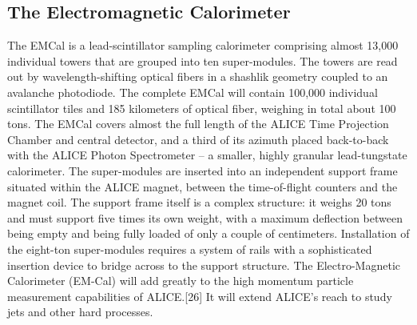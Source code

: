 \subsection{The Electromagnetic Calorimeter}
The EMCal is a lead-scintillator sampling calorimeter comprising almost 13,000 individual towers that are grouped into ten super-modules. The towers are read out by wavelength-shifting optical fibers in a shashlik geometry coupled to an avalanche photodiode. The complete EMCal will contain 100,000 individual scintillator tiles and 185 kilometers of optical fiber, weighing in total about 100 tons.
The EMCal covers almost the full length of the ALICE Time Projection Chamber and central detector, and a third of its azimuth placed back-to-back with the ALICE Photon Spectrometer – a smaller, highly granular lead-tungstate calorimeter.
The super-modules are inserted into an independent support frame situated within the ALICE magnet, between the time-of-flight counters and the magnet coil. The support frame itself is a complex structure: it weighs 20 tons and must support five times its own weight, with a maximum deflection between being empty and being fully loaded of only a couple of centimeters. Installation of the eight-ton super-modules requires a system of rails with a sophisticated insertion device to bridge across to the support structure.
The Electro-Magnetic Calorimeter (EM-Cal) will add greatly to the high momentum particle measurement capabilities of ALICE.[26] It will extend ALICE's reach to study jets and other hard processes.